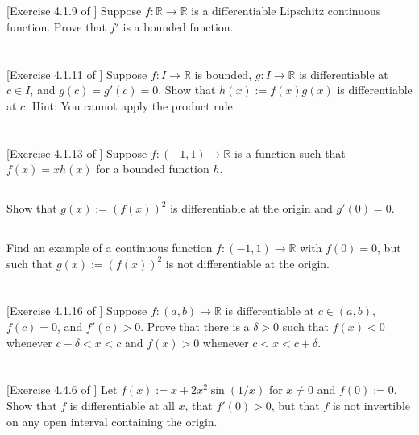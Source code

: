 \documentclass[11pt,letterpaper]{article}
\begin{document}
\section{} [Exercise 4.1.9 of \cite{Lebl_23}] 
Suppose $f:\mathbb{R}\to\mathbb{R}$ is a differentiable Lipschitz continuous function. Prove that $f'$ is a bounded function.

\section{} [Exercise 4.1.11 of \cite{Lebl_23}] 
Suppose $f:I\to\mathbb{R}$ is bounded, $g:I\to\mathbb{R}$ is differentiable at $c\in I$, and $g(c)=g'(c)=0$. Show that $h(x):=f(x)g(x)$ is differentiable at $c$. Hint: You cannot apply the product rule.

\section{} [Exercise 4.1.13 of \cite{Lebl_23}] 
Suppose $f:(-1,1)\to\mathbb{R}$ is a function such that $f(x)=xh(x)$ for a bounded function $h$.

\subsection{}
Show that $g(x):=(f(x))^2$ is differentiable at the origin and $g'(0)=0$.

\subsection{}
Find an example of a continuous function $f:(-1,1)\to\mathbb{R}$ with $f(0) = 0$, but such that $g(x):= (f(x))^2$ is not differentiable at the origin.

\section{} [Exercise 4.1.16 of \cite{Lebl_23}] 
Suppose $f:(a,b)\to\mathbb{R}$ is differentiable at $c\in(a,b)$, $f(c)=0$, and $f'(c)> 0$. Prove that there is a $\delta>0$ such that $f(x)<0$ whenever $c-\delta<x<c$ and $f(x)>0$ whenever $c<x<c+\delta$.

\section{} [Exercise 4.4.6 of \cite{Lebl_23}] 
Let $f(x):= x+2x^2\sin(1/x)$ for $x\neq 0$ and $f(0):= 0$. Show that $f$ is differentiable at all $x$, that $f'(0)>0$, but that $f$ is not invertible on any open interval containing the origin.




\vfill
\printbibliography
\end{document}
